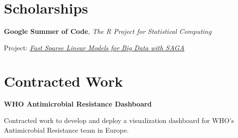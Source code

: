 \documentclass[
  10pt,
  headsepline=true,
  english,
  DIV=12
]{scrartcl}
\renewcommand*{%
  \mkbibnamegiven
}[1]{\ifitemannotation{highlight}{\textbf{#1}}{#1}}
\renewcommand*{%
  \mkbibnamefamily
}[1]{\ifitemannotation{highlight}{\textbf{#1}}{#1}}
\begin{document}
\section{Scholarships}
\begin{description}[
    labelwidth = \widthof{2018} + 1em,
    leftmargin = \widthof{2018} + 1em,
  ]

  \item[2018]{
              \textbf{Google Summer of Code}, \emph{The R Project for Statistical Computing}

              Project: \emph{\href{https://summerofcode.withgoogle.com/archive/2018/projects/6276491595743232/}{Fast Sparse Linear Models for Big Data with SAGA}}
        }
\end{description}

\section{Contracted Work}

\begin{description}[
    labelwidth = \widthof{2021} + 1em,
    leftmargin = \widthof{2021} + 1em,
  ]

  \item[2021]{
              \textbf{WHO Antimicrobial Resistance Dashboard}

              Contracted work to develop and deploy a visualization dashboard for
              WHO's Antimicrobial Resistance team in Europe.
        }
\end{description}
\end{document}
